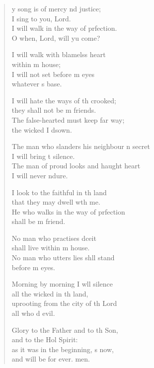 \begin{verse}
  \begin{patverse}
y song is of mercy nd justice;\Med\\
I sing to you,  Lord.\\
I will walk in the way of prfection.\Med\\
O when, Lord, will yu come?

I will walk with blamelss heart\Med\\
within m house;\\
I will not set before m eyes\Med\\
whatever \pointup{\i}s base.

I will hate the ways of th crooked;\Med\\
they shall not be m friends.\\
The false-hearted must keep far way;\Med\\
the wicked I d\pointup{\i}sown.

The man who slanders his neighbour \pointup{\i}n secret\Med\\
I will bring t silence.\\
The man of proud looks and haught heart\Med\\
I will never ndure.

I look to the faithful in th land\Med\\
that they may dwell w\pointup{\i}th me.\\
He who walks in the way of prfection\Med\\
shall be m friend.

No man who practises dceit\Med\\
shall live within m house.\\
No man who utters lies shll stand\Med\\
before m eyes.

Morning by morning I w\pointup{\i}ll silence\Med\\
all the wicked in th land,\\
uprooting from the city of th Lord\Med\\
all who d evil.

Glory to the Father and to th Son,\Med\\
and to the Hol Spirit:\\
as it was in the beginning, \pointup{\i}s now,\Med\\
and will be for ever. men.
  \end{patverse}
\end{verse}
